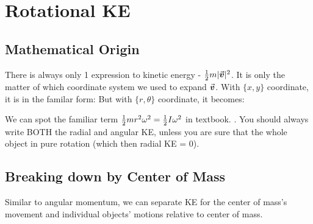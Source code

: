 \documentclass[class=article, crop=false, 12pt]{standalone}
\begin{document}
\section{Rotational KE}

\subsection{Mathematical Origin}
There is always only 1 expression to kinetic energy - $\frac{1}{2} m|\va*{v}|^2$. 
It is only the matter of which coordinate system we used to expand $\va*{v}$. 
With $\{x,y\}$ coordinate, it is in the familar form:
But with $\{r,\theta\}$ coordinate, it becomes:

We can spot the familiar term $ \frac{1}{2} mr^2\omega^2 = \frac{1}{2} I\omega^2$ in textbook. 
. 
You should always write BOTH the radial and angular KE,
unless you are sure that the whole object in pure rotation (which then radial KE = 0).


\subsection{Breaking down by Center of Mass}

Similar to angular momentum, we can separate KE for the center of mass's movement 
and individual objects' motions relative to center of mass.
\end{document}
